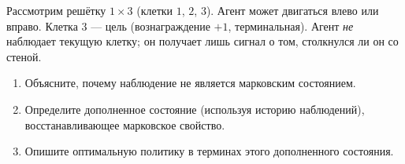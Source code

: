 \begin{exercise}
\label{ex:pomdp-teaser}
Рассмотрим решётку $1 \times 3$ (клетки $1$, $2$, $3$). Агент может двигаться влево или вправо. Клетка $3$ — цель (вознаграждение $+1$, терминальная). Агент \emph{не} наблюдает текущую клетку; он получает лишь сигнал о том, столкнулся ли он со стеной.
\begin{enumerate}[label=(\alph*)]
  \item Объясните, почему наблюдение не является марковским состоянием.
  \item Определите дополненное состояние (используя историю наблюдений), восстанавливающее марковское свойство.
  \item Опишите оптимальную политику в терминах этого дополненного состояния.
\end{enumerate}
\end{exercise}
